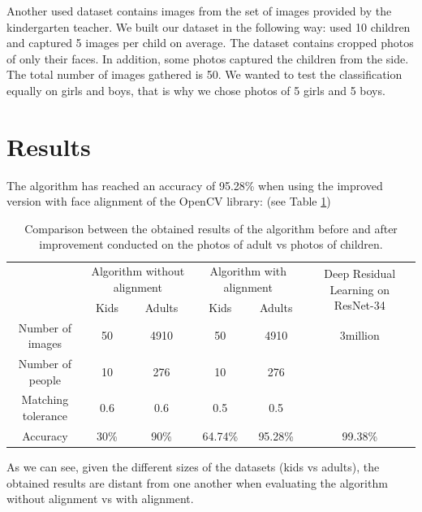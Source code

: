 \documentclass[runningheads,a4paper,11pt]{report}
\begin{document}
    Another used dataset contains images from the set of images provided by the kindergarten teacher. We built our dataset in the following way: used 10 children and captured 5 images per child on average. The dataset contains cropped photos of only their faces. In addition, some photos captured the children from the side. The total number of images gathered is 50. We wanted to test the classification equally on girls and boys, that is why we chose photos of 5 girls and 5 boys.

    \section{Results}
    \label{section:results}

    The algorithm has reached an accuracy of 95.28\% when using the improved version with face alignment of the OpenCV library: (see Table \ref{tab3PSO})


    \begin{longtable}[c]{ c | c | c | c | c | c }
        \caption{Comparison between the obtained results of the algorithm before and after improvement conducted on the photos of adult vs photos of children.}\label{tab3PSO}\\

        \hline
        \multirow{2}{4em}{} & \multicolumn{2}{c}{Algorithm without alignment } & \multicolumn{2}{|c|}{Algorithm with alignment} & \multirow{2}{11em}{Deep Residual Learning on ResNet-34} \\

        & Kids & Adults & Kids & Adults\\
        \hline\hline
        \endfirsthead
        \endhead

        \hline
        \endfoot

        \hline
        \hline\hline
        \endlastfoot

        Number of images & 50 & 4910 & 50 & 4910 & 3million \\
        Number of people & 10 & 276 & 10 & 276\\
        Matching tolerance & 0.6 & 0.6 & 0.5 & 0.5 \\
        \hline
        Accuracy & 30\% & 90\% & 64.74\% & 95.28\% & 99.38\%\\
    \end{longtable}

    As we can see, given the different sizes of the datasets (kids vs adults), the obtained results are distant from one another when evaluating the algorithm without alignment vs with alignment.
\end{document}

